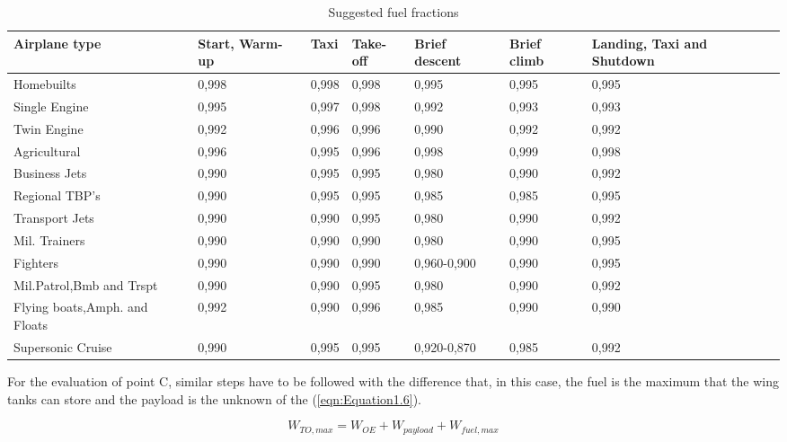 \bigskip
\begin{table}[!ht]
\centering
\begin{tabular}{p{2.7cm}p{1.8cm}p{1.1cm}p{1.7cm}p{2.4cm}p{1.2cm}p{2.1cm}}
\toprule
\textbf{Airplane type} & \textbf{Start}, \textbf{Warm-up} & \textbf{Taxi} & \textbf{Take-off} & \textbf{Brief descent} & \textbf{Brief climb} & \textbf{Landing, Taxi and Shutdown} \\
\midrule
Homebuilts                     & 0,998 & 0,998 & 0,998 & 0,995 & 0,995 & 0,995       \\[0.7cm]
Single Engine                  & 0,995 & 0,997 & 0,998 & 0,992 & 0,993 & 0,993       \\[0.7cm]
Twin Engine                    & 0,992 & 0,996 & 0,996 & 0,990 & 0,992 & 0,992       \\[0.7cm]
Agricultural                   & 0,996 & 0,995 & 0,996 & 0,998 & 0,999 & 0,998       \\[0.7cm]
Business Jets                  & 0,990 & 0,995 & 0,995 & 0,980 & 0,990 & 0,992       \\[0.7cm]
Regional TBP's                 & 0,990 & 0,995 & 0,995 & 0,985 & 0,985 & 0,995       \\[0.7cm]
Transport Jets                 & 0,990 & 0,990 & 0,995 & 0,980 & 0,990 & 0,992       \\[0.7cm]
Mil. Trainers                  & 0,990 & 0,990 & 0,990 & 0,980 & 0,990 & 0,995       \\[0.7cm]
Fighters                       & 0,990 & 0,990 & 0,990 & 0,960-0,900 & 0,990 & 0,995     \\[0.7cm]
Mil.Patrol,Bmb and Trspt       & 0,990 & 0,990 & 0,995 & 0,980 & 0,990 & 0,992       \\[0.7cm]
Flying boats,Amph. and Floats  & 0,992 & 0,990 & 0,996 & 0,985 & 0,990 & 0,990       \\[1.2	cm]
Supersonic Cruise              & 0,990 & 0,995 & 0,995 & 0,920-0,870 & 0,985 & 0,992     \\[0.1	cm]
\bottomrule
\end{tabular}
\caption{Suggested fuel fractions}
\label{table:Table1}
\end{table}

\noindent
For the evaluation of point C, similar steps have to be followed with the difference that, in this case, the fuel is the maximum that the wing tanks can store and the payload is the unknown of the (\ref{eqn:Equation1.6}).

\begin{equation}
W_{TO,max}=W_{OE}+W_{payload}+W_{fuel,max}
\label{eqn:Equation1.6}
\end{equation}

